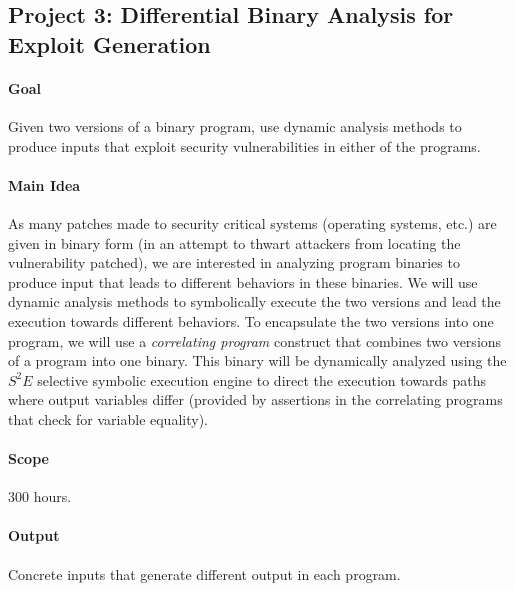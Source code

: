 \documentclass[english]{article}
\begin{document}
\subsection*{Project 3: Differential Binary Analysis for Exploit Generation}
\paragraph{Goal} Given two versions of a binary program, use dynamic analysis methods to produce inputs that exploit security vulnerabilities in either of the programs.
\paragraph{Main Idea} As many patches made to security critical systems (operating systems, etc.) are given in binary form (in an attempt to thwart attackers from locating the vulnerability patched), we are interested in analyzing program binaries to produce input that leads to different behaviors in these binaries. We will use dynamic analysis methods to symbolically execute the two versions and lead the execution towards different behaviors. To encapsulate the two versions into one program, we will use a \emph{correlating program} construct that combines two versions of a program into one binary. This binary will be dynamically analyzed using the $S^2E$ selective symbolic execution engine to direct the execution towards paths where output variables differ (provided by assertions in the correlating programs that check for variable equality).
\paragraph{Scope} 300 hours.
\paragraph{Output} Concrete inputs that generate different output in each program.
\end{document}
